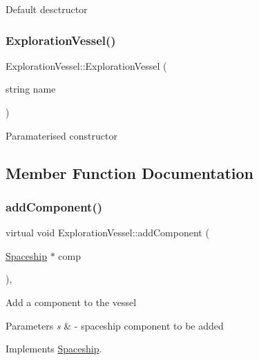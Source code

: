 Default desctructor \mbox{\label{classExplorationVessel_acc004a39ae71f367d3bca876fb02e9c5}} 
\subsubsection{\texorpdfstring{Exploration\+Vessel()}{ExplorationVessel()}\hspace{0.1cm}{\footnotesize\ttfamily [2/2]}}
{\footnotesize\ttfamily Exploration\+Vessel\+::\+Exploration\+Vessel (\begin{DoxyParamCaption}\item[{string}]{name }\end{DoxyParamCaption})\hspace{0.3cm}{\ttfamily [inline]}}

Paramaterised constructor 

\subsection{Member Function Documentation}
\mbox{\label{classExplorationVessel_ae952e198a28fd0a5ec998ecdcca86561}} 
\subsubsection{\texorpdfstring{add\+Component()}{addComponent()}}
{\footnotesize\ttfamily virtual void Exploration\+Vessel\+::add\+Component (\begin{DoxyParamCaption}\item[{\hyperlink{classSpaceship}{Spaceship} $\ast$}]{comp }\end{DoxyParamCaption})\hspace{0.3cm}{\ttfamily [inline]}, {\ttfamily [virtual]}}

Add a component to the vessel 
\begin{DoxyParams}{Parameters}
{\em s} & -\/ spaceship component to be added \\
\hline
\end{DoxyParams}


Implements \hyperlink{classSpaceship_ac1b4673a691cd100708ddea08cd9f192}{Spaceship}.

